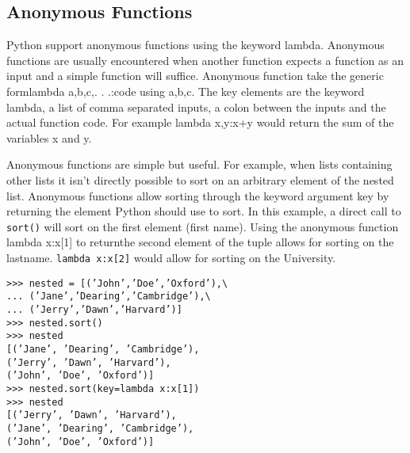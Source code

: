 \documentclass[KSmain.tex]{subfiles}
\begin{document}
\newpage
\subsection{Anonymous Functions}

Python support anonymous functions using the keyword lambda. Anonymous functions are usually encountered
when another function expects a function as an input and a simple function will suffice. Anonymous
function take the generic formlambda a,b,c,. . .:code using a,b,c. The key elements are the keyword
lambda, a list of comma separated inputs, a colon between the inputs and the actual function code. For
example lambda x,y:x+y would return the sum of the variables x and y.

Anonymous functions are simple but useful. For example, when lists containing other lists it isn’t
directly possible to sort on an arbitrary element of the nested list. Anonymous functions allow sorting
through the keyword argument key by returning the element Python should use to sort. In this example,
a direct call to \texttt{sort()} will sort on the first element (first name). Using the anonymous function
lambda x:x[1] to returnthe second element of the tuple allows for sorting on the lastname. \texttt{lambda x:x[2]}
would allow for sorting on the University.
\begin{framed}
	\begin{verbatim}
>>> nested = [(’John’,’Doe’,’Oxford’),\
... (’Jane’,’Dearing’,’Cambridge’),\
... (’Jerry’,’Dawn’,’Harvard’)]
>>> nested.sort()
>>> nested
[(’Jane’, ’Dearing’, ’Cambridge’),
(’Jerry’, ’Dawn’, ’Harvard’),
(’John’, ’Doe’, ’Oxford’)]
>>> nested.sort(key=lambda x:x[1])
>>> nested
[(’Jerry’, ’Dawn’, ’Harvard’),
(’Jane’, ’Dearing’, ’Cambridge’),
(’John’, ’Doe’, ’Oxford’)]
\end{verbatim}
\end{framed}
\end{document}
